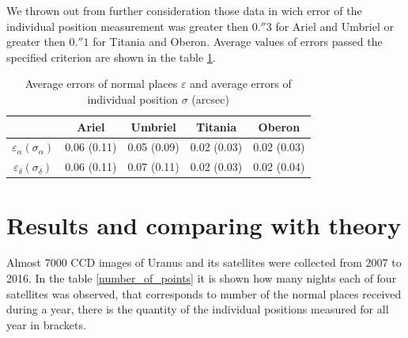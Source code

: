 \documentclass[]{article}
\begin{document}
We thrown out from further consideration those data in wich error of the individual position measurement was greater then $0.''3$ for Ariel and Umbriel or greater then $0.''1$ for Titania and Oberon. Average values of errors passed the specified criterion are shown in the table \ref{errors}.\par
\begin{table}[h!]
\caption{Average errors of normal places $\varepsilon$ and average errors of individual position $\sigma$ (arcsec)}
\label{errors}
\begin{center}
\begin{tabular}{|c|c|c|c|c|}
\hline
&Ariel&Umbriel&Titania&Oberon \\
\hline
$\varepsilon_\alpha (\sigma_\alpha)$&0.06 (0.11)&0.05 (0.09)&0.02 (0.03)&0.02 (0.03) \\
$\varepsilon_\delta (\sigma_\delta)$&0.06 (0.11)&0.07 (0.11)&0.02 (0.03)&0.02 (0.04) \\
\hline
\end{tabular}
\end{center}
\end{table}



\section{Results and comparing with theory}
Almost 7000 CCD images of Uranus and its satellites were collected from 2007 to 2016. In the table \ref{number_of_points} it is shown how many nights each of four satellites was observed, that corresponds to number of the normal places received during a year, there is the quantity of the individual positions measured for all year in brackets.\par
\end{document}
